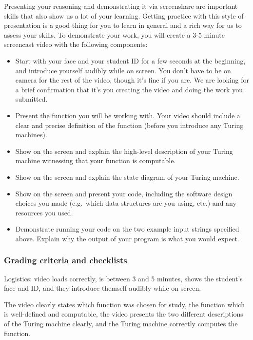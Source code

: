 \documentclass[12pt, oneside]{article}
\begin{document}
 Presenting your reasoning and demonstrating it via screenshare are important skills that 
 also show us a lot of your learning. Getting practice with this style of presentation is a 
 good thing for you to learn in general and a rich way for us to assess your skills. To demonstrate your work, you will create 
 a 3-5 minute screencast video with the following components:
 \begin{itemize}
	\item Start with your face and your student ID for a 
        few seconds at the beginning, and introduce yourself audibly 
        while on screen. 
	You don't have to be on camera for the rest of the 
        video, though it's fine if you are. 
	We are looking for a brief confirmation that it's 
        you creating the video and 
	doing the work you submitted.
	\item Present the function you will be working with.
	Your video should include a clear and precise definition of the               function (before you introduce any Turing machines).
	\item Show on the screen and explain the high-level description of
        your Turing machine witnessing that your function is computable.
	\item Show on the screen and explain the state diagram of 
        your Turing machine.
	\item Show on the screen and present your code, including
        the software design choices you made (e.g.\ which data structures
        are you using, etc.) and any resources you used.
        \item Demonstrate running your code on the two 
        example input strings specified above. Explain why the output 
        of your program is what you would expect.
\end{itemize}


\subsubsection*{Grading criteria and checklists}

Logistics: video loads correctly, is between 3 and 5 minutes, 
shows the student's face and ID, and they introduce themself 
audibly while on screen.

The video clearly states which function was chosen for study, 
the function which is well-defined and computable, the video
presents the two different descriptions of the Turing machine clearly,
and the Turing machine correctly computes the function.
\end{document}
